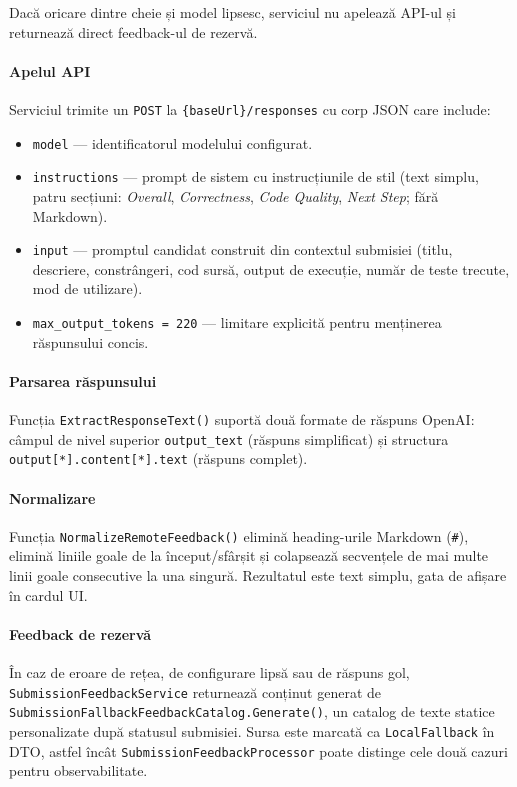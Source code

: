 Dacă oricare dintre cheie și model lipsesc, serviciul nu apelează API-ul
și returnează direct feedback-ul de rezervă.

\paragraph{Apelul API}
Serviciul trimite un \texttt{POST} la \texttt{\{baseUrl\}/responses}
cu corp JSON care include:
\begin{itemize}
  \item \texttt{model} — identificatorul modelului configurat.
  \item \texttt{instructions} — prompt de sistem cu instrucțiunile de stil
        (text simplu, patru secțiuni: \emph{Overall}, \emph{Correctness},
        \emph{Code Quality}, \emph{Next Step}; fără Markdown).
  \item \texttt{input} — promptul candidat construit din contextul submisiei
        (titlu, descriere, constrângeri, cod sursă, output de execuție,
        număr de teste trecute, mod de utilizare).
  \item \texttt{max\_output\_tokens = 220} — limitare explicită pentru
        menținerea răspunsului concis.
\end{itemize}

\paragraph{Parsarea răspunsului}
Funcția \texttt{ExtractResponseText()} suportă două formate de răspuns
OpenAI: câmpul de nivel superior \texttt{output\_text} (răspuns simplificat)
și structura \texttt{output[*].content[*].text} (răspuns complet).

\paragraph{Normalizare}
Funcția \texttt{NormalizeRemoteFeedback()} elimină heading-urile Markdown
(\texttt{\#}), elimină liniile goale de la început/sfârșit și colapsează
secvențele de mai multe linii goale consecutive la una singură.
Rezultatul este text simplu, gata de afișare în cardul UI.

\paragraph{Feedback de rezervă}
În caz de eroare de rețea, de configurare lipsă sau de răspuns gol,
\texttt{SubmissionFeedbackService} returnează conținut generat de
\texttt{SubmissionFallbackFeedbackCatalog.Generate()}, un catalog de
texte statice personalizate după statusul submisiei.
Sursa este marcată ca \texttt{LocalFallback} în DTO, astfel încât
\texttt{SubmissionFeedbackProcessor} poate distinge cele două cazuri
pentru observabilitate.


